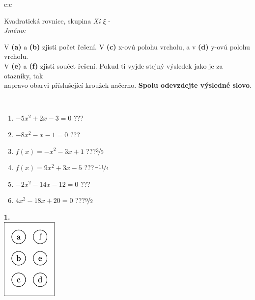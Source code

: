 \documentclass[10pt]{report}
\begin{document}
\begin{tabular}{c:c}
\begin{minipage}[c][104.5mm][t]{0.5\linewidth}
\begin{center}
\vspace{7mm}
{\huge Kvadratická rovnice, skupina \textit{Xi $\xi$} -}\\[5mm]
\textit{Jméno:}\phantom{xxxxxxxxxxxxxxxxxxxxxxxxxxxxxxxxxxxxxxxxxxxxxxxxxxxxxxxxxxxxxxxxx}\\[5mm]
\begin{minipage}{0.95\linewidth}
\begin{center}
V \textbf{(a)} a \textbf{(b)} zjisti počet řešení. V \textbf{(c)} x-ovú polohu vrcholu, a v \textbf{(d)} y-ovú polohu vrcholu.\\V \textbf{(e)} a \textbf{(f)} zjisti součet řešení. Pokud ti vyjde stejný výsledek jako je za otazníky, tak\\napravo obarvi příslušející kroužek načerno. \textbf{Spolu odevzdejte výsledné slovo}.
\end{center}
\end{minipage}
\\[1mm]
\begin{minipage}{0.79\linewidth}
\begin{center}
\begin{varwidth}{\linewidth}
\begin{enumerate}
\Large
\item $-5x^2+2x-3=0$\quad \dotfill\; ???\;\dotfill {}
\item $-8x^2-x-1=0$\quad \dotfill\; ???\;\dotfill {}
\item $f(x)=-x^2-3x+1$\quad \dotfill\; ???\;\dotfill \quad $\nicefrac{3}{2}$
\item $f(x)=9x^2+3x-5$\quad \dotfill\; ???\;\dotfill \quad $\nicefrac{-11}{4}$
\item $-2x^2-14x-12=0$\quad \dotfill\; ???\;\dotfill {}
\item $4x^2-18x+20=0$\quad \dotfill\; ???\;\dotfill \quad $\nicefrac{9}{2}$
\end{enumerate}
\end{varwidth}
\end{center}
\end{minipage}
\begin{minipage}{0.20\linewidth}
\begin{center}
{\Huge\bfseries 1.} \\[2mm]
\includegraphics[height=40mm]{../images/braille.png}

\end{center}
\end{minipage}
\end{center}
\end{minipage}
\end{tabular}
\end{document}
